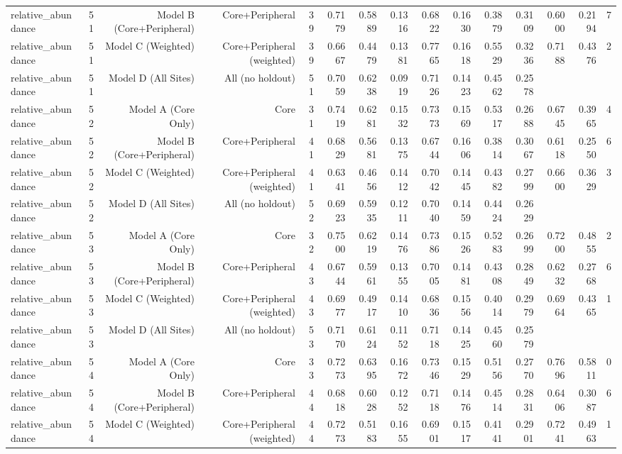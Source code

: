 {\begin{longtable}{lrrrrrrrrrrrrrr}
  relative\_abundance & 51 & Model B (Core+Peripheral) & Core+Peripheral & 39 & 0.7179 & 0.5889 & 0.1316 & 0.6822 & 0.1630 & 0.3879 & 0.3109 & 0.6000 & 0.2194 & 7 \\
  relative\_abundance & 51 & Model C (Weighted) & Core+Peripheral (weighted) & 39 & 0.6667 & 0.4479 & 0.1381 & 0.7765 & 0.1618 & 0.5529 & 0.3236 & 0.7188 & 0.4376 & 2 \\
  relative\_abundance & 51 & Model D (All Sites) & All (no holdout) & 51 & 0.7059 & 0.6238 & 0.0919 & 0.7126 & 0.1423 & 0.4562 & 0.2578 &  &  &  \\
  relative\_abundance & 52 & Model A (Core Only) & Core & 31 & 0.7419 & 0.6281 & 0.1532 & 0.7373 & 0.1569 & 0.5317 & 0.2688 & 0.6745 & 0.3965 & 4 \\
  relative\_abundance & 52 & Model B (Core+Peripheral) & Core+Peripheral & 41 & 0.6829 & 0.5681 & 0.1375 & 0.6744 & 0.1606 & 0.3814 & 0.3067 & 0.6118 & 0.2550 & 6 \\
  relative\_abundance & 52 & Model C (Weighted) & Core+Peripheral (weighted) & 41 & 0.6341 & 0.4656 & 0.1412 & 0.7042 & 0.1445 & 0.4382 & 0.2799 & 0.6600 & 0.3629 & 3 \\
  relative\_abundance & 52 & Model D (All Sites) & All (no holdout) & 52 & 0.6923 & 0.5935 & 0.1211 & 0.7040 & 0.1459 & 0.4424 & 0.2629 &  &  &  \\
  relative\_abundance & 53 & Model A (Core Only) & Core & 32 & 0.7500 & 0.6219 & 0.1476 & 0.7386 & 0.1526 & 0.5283 & 0.2699 & 0.7200 & 0.4855 & 2 \\
  relative\_abundance & 53 & Model B (Core+Peripheral) & Core+Peripheral & 43 & 0.6744 & 0.5961 & 0.1355 & 0.7005 & 0.1481 & 0.4308 & 0.2849 & 0.6232 & 0.2768 & 6 \\
  relative\_abundance & 53 & Model C (Weighted) & Core+Peripheral (weighted) & 43 & 0.6977 & 0.4917 & 0.1410 & 0.6836 & 0.1556 & 0.4014 & 0.2979 & 0.6964 & 0.4365 & 1 \\
  relative\_abundance & 53 & Model D (All Sites) & All (no holdout) & 53 & 0.7170 & 0.6124 & 0.1152 & 0.7118 & 0.1425 & 0.4560 & 0.2579 &  &  &  \\
  relative\_abundance & 54 & Model A (Core Only) & Core & 33 & 0.7273 & 0.6395 & 0.1672 & 0.7346 & 0.1529 & 0.5156 & 0.2770 & 0.7696 & 0.5811 & 0 \\
  relative\_abundance & 54 & Model B (Core+Peripheral) & Core+Peripheral & 44 & 0.6818 & 0.6028 & 0.1252 & 0.7118 & 0.1476 & 0.4514 & 0.2831 & 0.6406 & 0.3087 & 6 \\
  relative\_abundance & 54 & Model C (Weighted) & Core+Peripheral (weighted) & 44 & 0.7273 & 0.5183 & 0.1655 & 0.6901 & 0.1517 & 0.4141 & 0.2901 & 0.7241 & 0.4963 & 1 \\

\end{longtable}}
